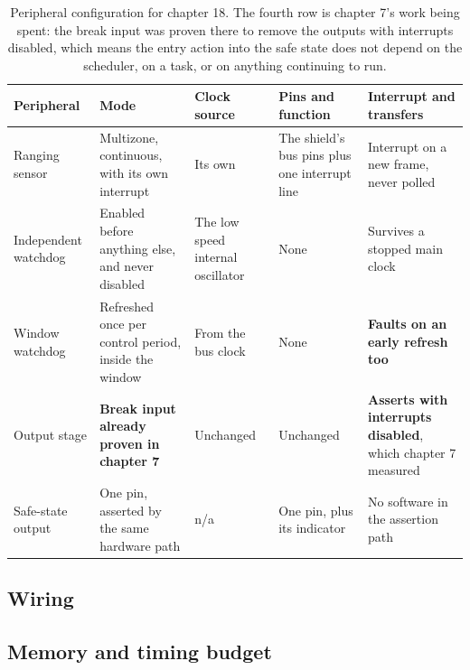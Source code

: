 \begin{table}[H]\centering\small
\begin{tabular}{p{22mm}p{26mm}p{24mm}p{30mm}p{30mm}}
\toprule
Peripheral & Mode & Clock source & Pins and function & Interrupt and transfers \\
\midrule
Ranging sensor & Multizone, continuous, with its own interrupt & Its own & The
shield's bus pins plus one interrupt line & Interrupt on a new frame, never
polled \\
Independent watchdog & Enabled before anything else, and never disabled & The low
speed internal oscillator & None & Survives a stopped main clock \\
Window watchdog & Refreshed once per control period, inside the window & From
the bus clock & None & \textbf{Faults on an early refresh too} \\
Output stage & \textbf{Break input already proven in chapter 7} & Unchanged &
Unchanged & \textbf{Asserts with interrupts disabled}, which chapter 7 measured \\
Safe-state output & One pin, asserted by the same hardware path & n/a & One pin,
plus its indicator & No software in the assertion path \\
\bottomrule
\end{tabular}
\caption{Peripheral configuration for chapter 18. The fourth row is chapter 7's work being spent: the break input was proven there to remove the outputs with interrupts disabled, which means the entry action into the safe state does not depend on the scheduler, on a task, or on anything continuing to run.}
\end{table}

\subsection*{Wiring}


\subsection*{Memory and timing budget}

